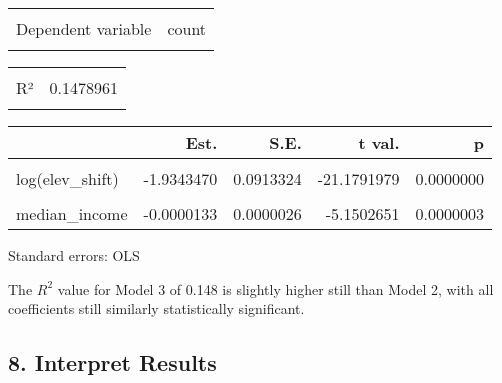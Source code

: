 \documentclass[
]{article}
\begin{document}
\begin{table}[!h]
\centering
\begin{tabular}{lr}
\toprule
\cellcolor{gray!6}{Observations} & \cellcolor{gray!6}{4391 (23 missing obs. deleted)}\\
Dependent variable & count\\
\cellcolor{gray!6}{Type} & \cellcolor{gray!6}{OLS linear regression}\\
\bottomrule
\end{tabular}
\end{table} \begin{table}[!h]
\centering
\begin{tabular}{lr}
\toprule
\cellcolor{gray!6}{F(3,4387)} & \cellcolor{gray!6}{253.8109749}\\
R² & 0.1478961\\
\cellcolor{gray!6}{Adj. R²} & \cellcolor{gray!6}{0.1473134}\\
\bottomrule
\end{tabular}
\end{table} \begin{table}[!h]
\centering
\begin{threeparttable}
\begin{tabular}{lrrrr}
\toprule
  & Est. & S.E. & t val. & p\\
\midrule
\cellcolor{gray!6}{(Intercept)} & \cellcolor{gray!6}{17.3094410} & \cellcolor{gray!6}{0.4958695} & \cellcolor{gray!6}{34.9072477} & \cellcolor{gray!6}{0.0000000}\\
log(elev\_shift) & -1.9343470 & 0.0913324 & -21.1791979 & 0.0000000\\
\cellcolor{gray!6}{log(slope\_shift)} & \cellcolor{gray!6}{-0.6571915} & \cellcolor{gray!6}{0.0957164} & \cellcolor{gray!6}{-6.8660252} & \cellcolor{gray!6}{0.0000000}\\
median\_income & -0.0000133 & 0.0000026 & -5.1502651 & 0.0000003\\
\bottomrule
\end{tabular}
\begin{tablenotes}
\item Standard errors: OLS
\end{tablenotes}
\end{threeparttable}
\end{table}

The \(R^2\) value for Model 3 of 0.148 is slightly higher still than
Model 2, with all coefficients still similarly statistically
significant.

\hypertarget{interpret-results}{%
\subsection{8. Interpret Results}\label{interpret-results}}
\end{document}
